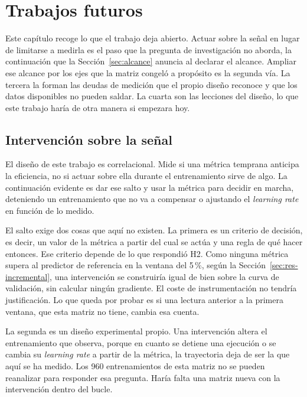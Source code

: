 \chapter{Trabajos futuros}
\label{ch:trabajos-futuros}

Este capítulo recoge lo que el trabajo deja abierto. Actuar sobre la señal en lugar de limitarse a medirla es el paso que la pregunta de investigación no aborda, la continuación que la Sección~\ref{sec:alcance} anuncia al declarar el alcance. Ampliar ese alcance por los ejes que la matriz congeló a propósito es la segunda vía. La tercera la forman las deudas de medición que el propio diseño reconoce y que los datos disponibles no pueden saldar. La cuarta son las lecciones del diseño, lo que este trabajo haría de otra manera si empezara hoy.

\section{Intervención sobre la señal}
\label{sec:futuro-intervencion}

El diseño de este trabajo es correlacional. Mide si una métrica temprana anticipa la eficiencia, no si actuar sobre ella durante el entrenamiento sirve de algo. La continuación evidente es dar ese salto y usar la métrica para decidir en marcha, deteniendo un entrenamiento que no va a compensar o ajustando el \emph{learning rate} en función de lo medido.

El salto exige dos cosas que aquí no existen. La primera es un criterio de decisión, es decir, un valor de la métrica a partir del cual se actúa y una regla de qué hacer entonces. Ese criterio depende de lo que respondió H2. Como ninguna métrica supera al predictor de referencia en la ventana del 5\,\%, según la Sección~\ref{sec:res-incremental}, una intervención se construiría igual de bien sobre la curva de validación, sin calcular ningún gradiente. El coste de instrumentación no tendría justificación. Lo que queda por probar es si una lectura anterior a la primera ventana, que esta matriz no tiene, cambia esa cuenta.

La segunda es un diseño experimental propio. Una intervención altera el entrenamiento que observa, porque en cuanto se detiene una ejecución o se cambia su \emph{learning rate} a partir de la métrica, la trayectoria deja de ser la que aquí se ha medido. Los 960 entrenamientos de esta matriz no se pueden reanalizar para responder esa pregunta. Haría falta una matriz nueva con la intervención dentro del bucle.

